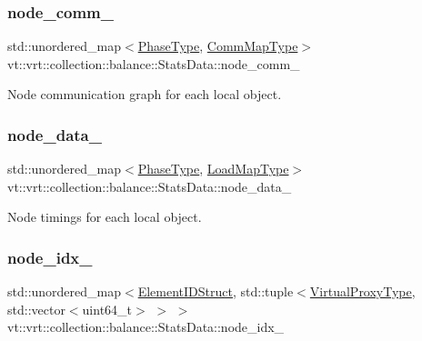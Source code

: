\subsubsection{\texorpdfstring{node\+\_\+comm\+\_\+}{node\_comm\_}}
{\footnotesize\ttfamily std\+::unordered\+\_\+map$<$\hyperlink{namespacevt_a46ce6733d5cdbd735d561b7b4029f6d7}{Phase\+Type}, \hyperlink{namespacevt_1_1vrt_1_1collection_1_1balance_a01ee1fb0ae2da1d2ab7fdca3be9ae351}{Comm\+Map\+Type}$>$ vt\+::vrt\+::collection\+::balance\+::\+Stats\+Data\+::node\+\_\+comm\+\_\+}



Node communication graph for each local object. 

\mbox{\label{structvt_1_1vrt_1_1collection_1_1balance_1_1_stats_data_a34a782537ef1b33bfc1c7b1f635e1c72}} 
\subsubsection{\texorpdfstring{node\+\_\+data\+\_\+}{node\_data\_}}
{\footnotesize\ttfamily std\+::unordered\+\_\+map$<$\hyperlink{namespacevt_a46ce6733d5cdbd735d561b7b4029f6d7}{Phase\+Type}, \hyperlink{namespacevt_1_1vrt_1_1collection_1_1balance_a5339303db2e1ce964d783a53fd74e6b1}{Load\+Map\+Type}$>$ vt\+::vrt\+::collection\+::balance\+::\+Stats\+Data\+::node\+\_\+data\+\_\+}



Node timings for each local object. 

\mbox{\label{structvt_1_1vrt_1_1collection_1_1balance_1_1_stats_data_a28e705281f97d1afd659848de7af7d7b}} 
\subsubsection{\texorpdfstring{node\+\_\+idx\+\_\+}{node\_idx\_}}
{\footnotesize\ttfamily std\+::unordered\+\_\+map$<$\hyperlink{namespacevt_1_1vrt_1_1collection_1_1balance_a9f5b53fafb270212279a4757d2c4cd28}{Element\+I\+D\+Struct}, std\+::tuple$<$\hyperlink{namespacevt_a1b417dd5d684f045bb58a0ede70045ac}{Virtual\+Proxy\+Type}, std\+::vector$<$uint64\+\_\+t$>$ $>$ $>$ vt\+::vrt\+::collection\+::balance\+::\+Stats\+Data\+::node\+\_\+idx\+\_\+}



